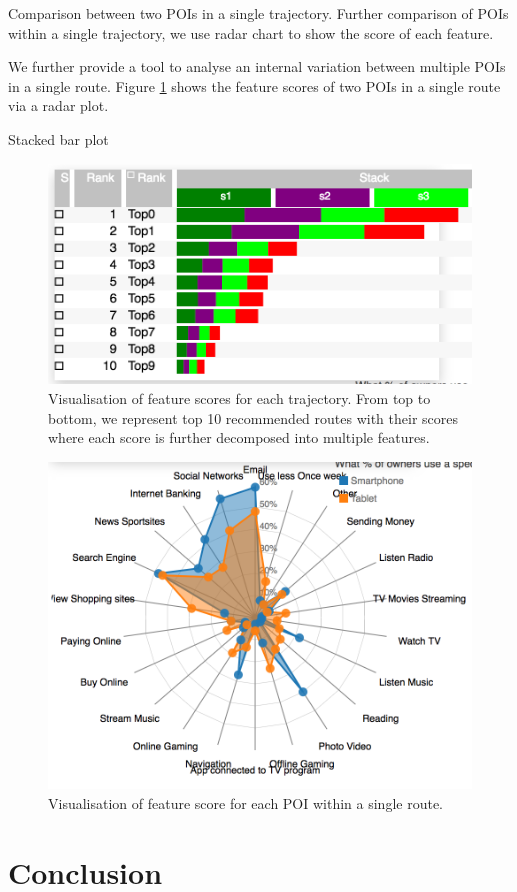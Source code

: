\documentclass[sigconf]{acmart}
\begin{document}
Comparison between two POIs in a single trajectory.
Further comparison of POIs within a single trajectory, we use radar chart to show the score of each feature.

We further provide a tool to analyse an internal variation between multiple POIs in a single route. 
Figure \ref{fig:radar} shows the feature scores of two POIs in a single route via a radar plot. 

Stacked bar plot \cite{gratzl2013lineup}


\begin{figure}[t!]
\includegraphics[width=0.9\linewidth]{figure/sample_stack.png}
\caption{Visualisation of feature scores for each trajectory. From top to bottom, we represent top 10 recommended routes with their scores where each score is further decomposed into multiple features.}
\end{figure}

\begin{figure}[t!]
\includegraphics[width=0.9\linewidth]{figure/sample_radar.png}
\caption{Visualisation of feature score for each POI within a single route.}
\label{fig:radar}
\end{figure}


\section{Conclusion}



 
\end{document}
